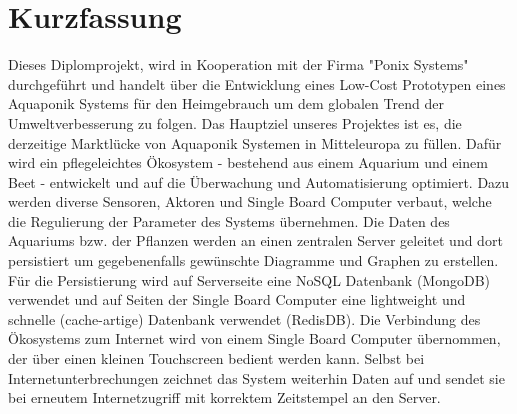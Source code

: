 \section*{Kurzfassung}

Dieses Diplomprojekt, wird in Kooperation mit der Firma "Ponix Systems" durchgef\"uhrt und handelt \"uber die Entwicklung eines Low-Cost Prototypen eines Aquaponik Systems f\"ur den Heimgebrauch um dem globalen Trend der Umweltverbesserung zu folgen. Das Hauptziel unseres Projektes ist es, die derzeitige Marktl\"ucke von Aquaponik Systemen in Mitteleuropa zu f\"ullen. Daf\"ur wird ein pflegeleichtes \"Okosystem - bestehend aus einem Aquarium und einem Beet - entwickelt und auf die \"Uberwachung und Automatisierung optimiert. Dazu werden diverse Sensoren, Aktoren und Single Board Computer verbaut, welche die Regulierung der Parameter des Systems \"ubernehmen. Die Daten des Aquariums bzw. der Pflanzen werden an einen zentralen Server geleitet und dort persistiert um gegebenenfalls gew\"unschte Diagramme und Graphen zu erstellen. F\"ur die Persistierung wird auf Serverseite eine NoSQL Datenbank (MongoDB) verwendet und auf Seiten der Single Board Computer eine lightweight und schnelle (cache-artige) Datenbank verwendet (RedisDB).  Die Verbindung des \"Okosystems zum Internet wird von einem Single Board Computer \"ubernommen, der \"uber einen kleinen Touchscreen bedient werden kann. Selbst bei Internetunterbrechungen zeichnet das System weiterhin Daten auf und sendet sie bei erneutem Internetzugriff mit korrektem Zeitstempel an den Server.
